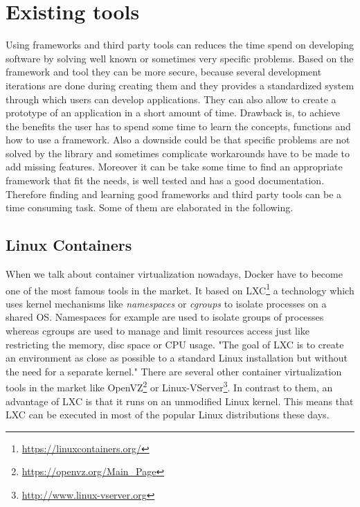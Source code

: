 \section{Existing tools}

Using frameworks and third party tools can reduces the time spend on developing software by solving well known or sometimes very specific problems.
Based on the framework and tool they can be more secure, because several development iterations are done during creating them and they provides a standardized system through which users can develop applications.
They can also allow to create a prototype of an application in a short amount of time.
Drawback is, to achieve the benefits the user has to spend some time to learn the concepts, functions and how to use a framework.
Also a downside could be that specific problems are not solved by the library and sometimes complicate workarounds have to be made to add missing features.
Moreover it can be take some time to find an appropriate framework that fit the needs, is well tested and has a good documentation.
Therefore finding and learning good frameworks and third party tools can be a time consuming task.
Some of them are elaborated in the following.

\subsection{Linux Containers}
When we talk about container virtualization nowadays, Docker have to become one of the most famous tools in the market.
It based on \ac{LXC}\footnote{\url{https://linuxcontainers.org/}} a technology which uses kernel mechanisms like \textit{namespaces} or \textit{cgroups} to isolate processes on a shared \ac{OS}.\autocite[cf.][p. 381]{Pahl:2015}
Namespaces for example are used to isolate groups of processes whereas cgroups are used to manage and limit resources access just like restricting the memory, disc space or \ac{CPU} usage.\autocite[cf.][p. 381]{Pahl:2015}
"The goal of \ac{LXC} is to create an environment as close as possible to a standard Linux installation but without the need for a separate kernel."\autocite[p. 72]{Tosatto:2015}
There are several other container virtualization tools in the market like OpenVZ\footnote{\url{https://openvz.org/Main_Page}} or Linux-VServer\footnote{\url{http://www.linux-vserver.org}}.
In contrast to them, an advantage of \ac{LXC} is that it runs on an unmodified Linux kernel.
This means that \ac{LXC} can be executed in most of the popular Linux distributions these days.

